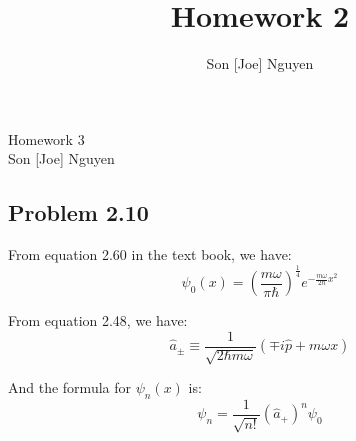 \documentclass{article}
\title{Homework 2}
\author{Son [Joe] Nguyen}
\begin{document}
\begin{center}
	\LARGE{Homework 3}\\[1em]
	\large Son [Joe] Nguyen\\[1em]
\end{center}
\subsection*{Problem 2.10}
From equation 2.60 in the text book, we have:
\[\psi_0(x) = \left(\frac{m \omega}{\pi \hbar}\right)^\frac{1}{4} e^{-\frac{m \omega}{2\hbar}x^2}\]

\noindent From equation 2.48, we have:
\[\hat{a}_\pm \equiv \frac{1}{\sqrt{2 \hbar m \omega}} \left(\mp i\hat{p} + m \omega x\right)\]

\noindent And the formula for $\psi_n(x)$ is:
\[\psi_n = \frac{1}{\sqrt{n!}} \left(\hat{a}_+\right)^n \psi_0\]
\end{document}
